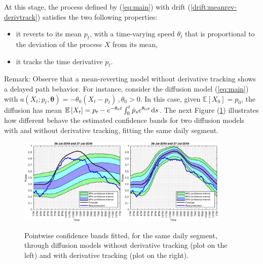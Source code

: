 \documentclass[11pt]{article}
\theoremstyle{definition}
\begin{document}
 At this stage, the process defined by (\ref{eq:main}) with drift (\ref{drift:meanrev-derivtrack}) satisfies the two following properties: 
\begin{itemize}
\item it reverts to its mean $p_t$, with a time-varying speed $ \theta_t$ that is proportional to the deviation of the process $X$ from its mean,
\item it tracks the time derivative $\dot{p}_t$.  
\end{itemize} 

Remark: Observe that a mean-reverting model without derivative tracking shows a delayed path behavior. For instance, consider the diffusion model (\ref{eq:main}) with $a(X_t; p_t, \bm{\theta}) = - \theta_0 (X_t - p_t)\,, \theta_0 > 0$. In this case, given  $ \mathbb{E} \left[X_0\right] = p_0$, the diffusion has mean $\mathbb{E} \left[X_t\right] = p_t - e^{- \theta_0 t } \int_0^t \dot{p}_s  e^{\theta_0 s} \dif s$. The next Figure (\ref{fig:derivative_tracking}) illustrates how different behave the estimated confidence bands for two diffusion models with and without derivative tracking, fitting the same daily segment. 

\begin{figure}[H]
\centering
  \includegraphics[width=0.45\textwidth]{plots/31.eps}\includegraphics[width=0.45\textwidth]{plots/31_2.eps}
  \caption{Pointwise confidence bands fitted, for the same daily segment, through diffusion models without derivative tracking (plot on the left) and with derivative tracking (plot on the right).}
  \label{fig:derivative_tracking}
\end{figure}
\end{document}
